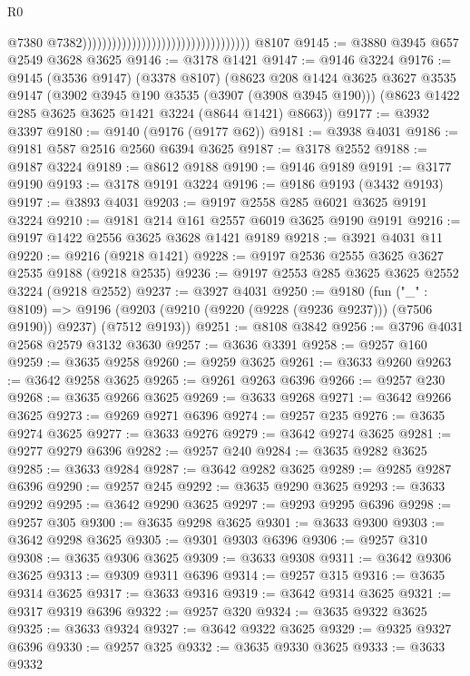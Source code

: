 \begin{lexlean}{R0}
\begin{coremodule}
                                                                        @7380
                                                                        @7382))))))))))))))))))))))))))))))))))
    @8107
@9145 := @3880 @3945 @657 @2549 @3628 @3625
@9146 := @3178 @1421
@9147 := @9146 @3224
@9176 := @9145
    (@3536 @9147)
    (@3378 @8107)
    (@8623
      @208
      @1424
      @3625
      @3627
      @3535
      @9147
      (@3902 @3945 @190 @3535 (@3907 (@3908 @3945 @190)))
      (@8623 @1422 @285 @3625 @3625 @1421 @3224 (@8644 @1421) @8663))
@9177 := @3932 @3397
@9180 := @9140 (@9176 (@9177 @62))
@9181 := @3938 @4031
@9186 := @9181 @587 @2516 @2560 @6394 @3625
@9187 := @3178 @2552
@9188 := @9187 @3224
@9189 := @8612 @9188
@9190 := @9146 @9189
@9191 := @3177 @9190
@9193 := @3178 @9191 @3224
@9196 := @9186 @9193 (@3432 @9193)
@9197 := @3893 @4031
@9203 := @9197 @2558 @285 @6021 @3625 @9191 @3224
@9210 := @9181 @214 @161 @2557 @6019 @3625 @9190 @9191
@9216 := @9197 @1422 @2556 @3625 @3628 @1421 @9189
@9218 := @3921 @4031 @11
@9220 := @9216 (@9218 @1421)
@9228 := @9197 @2536 @2555 @3625 @3627 @2535 @9188 (@9218 @2535)
@9236 := @9197 @2553 @285 @3625 @3625 @2552 @3224 (@9218 @2552)
@9237 := @3927 @4031
@9250 := @9180
    (fun ("_" : @8109) =>
    @9196 (@9203 (@9210 (@9220 (@9228 (@9236 @9237))) (@7506 @9190)) @9237) (@7512 @9193))
@9251 := @8108 @3842
@9256 := @3796 @4031 @2568 @2579 @3132 @3630
@9257 := @3636 @3391
@9258 := @9257 @160
@9259 := @3635 @9258
@9260 := @9259 @3625
@9261 := @3633 @9260
@9263 := @3642 @9258 @3625
@9265 := @9261 @9263 @6396
@9266 := @9257 @230
@9268 := @3635 @9266 @3625
@9269 := @3633 @9268
@9271 := @3642 @9266 @3625
@9273 := @9269 @9271 @6396
@9274 := @9257 @235
@9276 := @3635 @9274 @3625
@9277 := @3633 @9276
@9279 := @3642 @9274 @3625
@9281 := @9277 @9279 @6396
@9282 := @9257 @240
@9284 := @3635 @9282 @3625
@9285 := @3633 @9284
@9287 := @3642 @9282 @3625
@9289 := @9285 @9287 @6396
@9290 := @9257 @245
@9292 := @3635 @9290 @3625
@9293 := @3633 @9292
@9295 := @3642 @9290 @3625
@9297 := @9293 @9295 @6396
@9298 := @9257 @305
@9300 := @3635 @9298 @3625
@9301 := @3633 @9300
@9303 := @3642 @9298 @3625
@9305 := @9301 @9303 @6396
@9306 := @9257 @310
@9308 := @3635 @9306 @3625
@9309 := @3633 @9308
@9311 := @3642 @9306 @3625
@9313 := @9309 @9311 @6396
@9314 := @9257 @315
@9316 := @3635 @9314 @3625
@9317 := @3633 @9316
@9319 := @3642 @9314 @3625
@9321 := @9317 @9319 @6396
@9322 := @9257 @320
@9324 := @3635 @9322 @3625
@9325 := @3633 @9324
@9327 := @3642 @9322 @3625
@9329 := @9325 @9327 @6396
@9330 := @9257 @325
@9332 := @3635 @9330 @3625
@9333 := @3633 @9332

\end{coremodule}
\end{lexlean}
